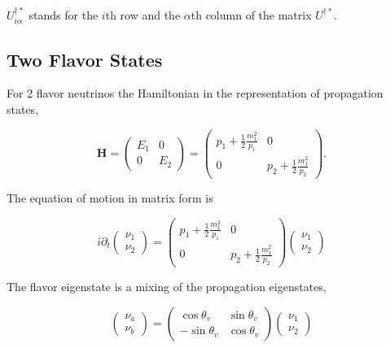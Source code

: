 \documentclass{tufte-handout}
\begin{document}
$U^{\dagger *}_{i\alpha}$ stands for the $i$th row and the $\alpha$th column of the matrix $U^{\dagger *}$. 



\subsection{Two Flavor States}


For 2 flavor neutrinos the Hamiltonian in the representation of propagation states,

\begin{equation*}
\mathbf H  = \begin{pmatrix}
E_1 & 0 \\
0 & E_2
\end{pmatrix} 
 = \begin{pmatrix}
p_1 + \frac{1}{2}\frac{m_1^2}{p_1} & 0 \\
0 & p_2 + \frac{1}{2}\frac{m_1^2}{p_2}
\end{pmatrix}.
\end{equation*}

The equation of motion in matrix form is

\begin{equation}
i\partial_t \begin{pmatrix}
\nu_1 \\ \nu_2 \end{pmatrix} = \begin{pmatrix}
p_1 + \frac{1}{2}\frac{m_1^2}{p_1} & 0 \\
0 & p_2 + \frac{1}{2}\frac{m_1^2}{p_2}
\end{pmatrix} \begin{pmatrix}
\nu_1 \\ \nu_2 \end{pmatrix} 
\end{equation}

The flavor eigenstate is a mixing of the propagation eigenstates,

\begin{equation}
\begin{pmatrix}
\nu_a \\ \nu_b \end{pmatrix} = 
\begin{pmatrix} \cos\theta_v & \sin\theta_v \\ -\sin\theta_v  & \cos\theta_v
\end{pmatrix} \begin{pmatrix}  \nu_1 \\ \nu_2
\end{pmatrix}
\end{equation}
\end{document}
